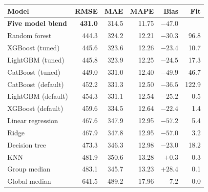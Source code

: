 \begin{tabular}{lrrrrr}
\hline
\textbf{Model} & \textbf{RMSE} & \textbf{MAE} & \textbf{MAPE} & \textbf{Bias} & \textbf{Fit} \\
\hline
\textbf{Five model blend} & \textbf{431.0} & 314.5 & 11.75 & $-47.0$ &  \\
Random forest & 444.3 & 324.2 & 12.21 & $-30.3$ & 96.8 \\
XGBoost (tuned) & 445.6 & 323.6 & 12.26 & $-23.4$ & 10.7 \\
LightGBM (tuned) & 445.8 & 323.9 & 12.25 & $-24.5$ & 17.3 \\
CatBoost (tuned) & 449.0 & 331.0 & 12.40 & $-49.9$ & 46.7 \\
CatBoost (default) & 452.2 & 331.3 & 12.50 & $-36.5$ & 122.9 \\
LightGBM (default) & 454.3 & 331.1 & 12.54 & $-25.2$ & 0.5 \\
XGBoost (default) & 459.6 & 334.5 & 12.64 & $-22.4$ & 1.4 \\
Linear regression & 467.6 & 347.9 & 12.95 & $-57.2$ & 5.4 \\
Ridge & 467.9 & 347.8 & 12.95 & $-57.0$ & 3.2 \\
Decision tree & 473.3 & 346.3 & 12.98 & $-23.0$ & 18.2 \\
KNN & 481.9 & 350.6 & 13.28 & $+0.3$ & 0.3 \\
Group median & 483.1 & 345.7 & 13.23 & $+28.4$ & 0.1 \\
Global median & 641.5 & 489.2 & 17.96 & $-7.2$ & 0.0 \\
\hline
\end{tabular}
